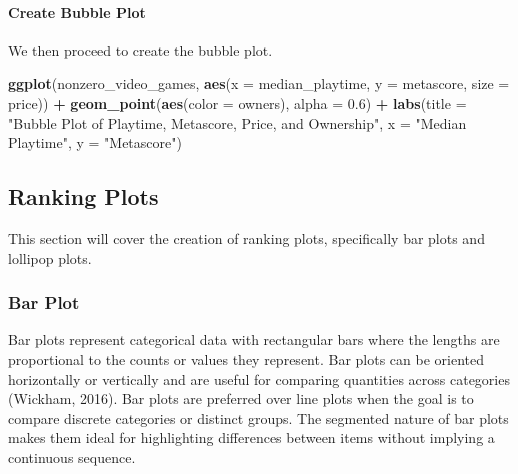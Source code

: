 \documentclass[
]{book}
\newenvironment{Shaded}{\begin{snugshade}}{\end{snugshade}}
\newcommand{\AttributeTok}[1]{\textcolor[rgb]{0.13,0.29,0.53}{#1}}
\newcommand{\FloatTok}[1]{\textcolor[rgb]{0.00,0.00,0.81}{#1}}
\newcommand{\FunctionTok}[1]{\textcolor[rgb]{0.13,0.29,0.53}{\textbf{#1}}}
\newcommand{\NormalTok}[1]{#1}
\newcommand{\SpecialCharTok}[1]{\textcolor[rgb]{0.81,0.36,0.00}{\textbf{#1}}}
\newcommand{\StringTok}[1]{\textcolor[rgb]{0.31,0.60,0.02}{#1}}
\begin{document}
\hypertarget{create-bubble-plot}{%
\paragraph*{Create Bubble Plot}\label{create-bubble-plot}}

We then proceed to create the bubble plot.

\begin{Shaded}
\begin{Highlighting}[]
\FunctionTok{ggplot}\NormalTok{(nonzero\_video\_games, }\FunctionTok{aes}\NormalTok{(}\AttributeTok{x =}\NormalTok{ median\_playtime, }\AttributeTok{y =}\NormalTok{ metascore, }\AttributeTok{size =}\NormalTok{ price)) }\SpecialCharTok{+}
  \FunctionTok{geom\_point}\NormalTok{(}\FunctionTok{aes}\NormalTok{(}\AttributeTok{color =}\NormalTok{ owners), }\AttributeTok{alpha =} \FloatTok{0.6}\NormalTok{) }\SpecialCharTok{+}
  \FunctionTok{labs}\NormalTok{(}\AttributeTok{title =} \StringTok{"Bubble Plot of Playtime, Metascore, Price, and Ownership"}\NormalTok{,}
       \AttributeTok{x =} \StringTok{"Median Playtime"}\NormalTok{,}
       \AttributeTok{y =} \StringTok{"Metascore"}\NormalTok{)}
\end{Highlighting}
\end{Shaded}

\hypertarget{ranking-plots}{%
\subsection*{Ranking Plots}\label{ranking-plots}}

This section will cover the creation of ranking plots, specifically bar plots and lollipop plots.

\hypertarget{bar-plot}{%
\subsubsection*{Bar Plot}\label{bar-plot}}

Bar plots represent categorical data with rectangular bars where the lengths are proportional to the counts or values they represent. Bar plots can be oriented horizontally or vertically and are useful for comparing quantities across categories (Wickham, 2016). Bar plots are preferred over line plots when the goal is to compare discrete categories or distinct groups. The segmented nature of bar plots makes them ideal for highlighting differences between items without implying a continuous sequence.
\end{document}
